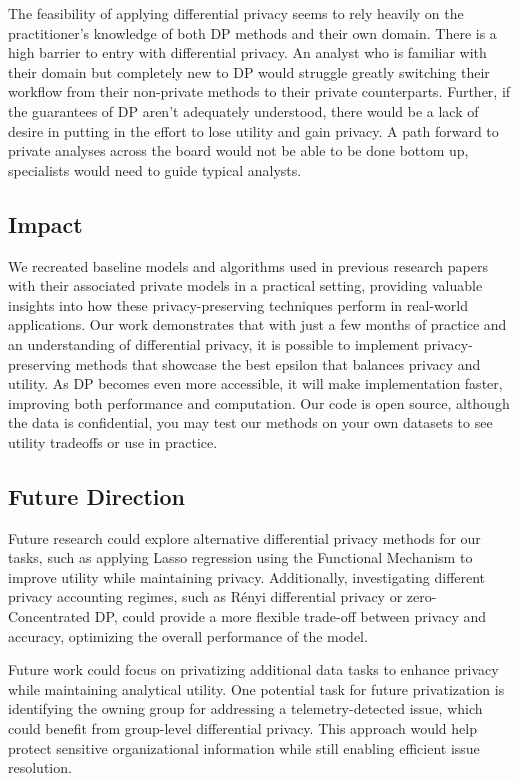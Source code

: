 \documentclass[12pt,letterpaper]{article}
\begin{document}
The feasibility of applying differential privacy seems to rely heavily on the practitioner's knowledge of both DP methods and their own domain. There is a high barrier to entry with differential privacy. An analyst who is familiar with their domain but completely new to DP would struggle greatly switching their workflow from their non-private methods to their private counterparts. Further, if the guarantees of DP aren't adequately understood, there would be a lack of desire in putting in the effort to lose utility and gain privacy. A path forward to private analyses across the board would not be able to be done bottom up, specialists would need to guide typical analysts.

\subsection{Impact}
We recreated baseline models and algorithms used in previous research papers with their associated private models in a practical setting, providing valuable insights into how these privacy-preserving techniques perform in real-world applications. Our work demonstrates that with just a few months of practice and an understanding of differential privacy, it is possible to implement privacy-preserving methods that showcase the best epsilon that balances privacy and utility. As DP becomes even more accessible, it will make implementation faster, improving both performance and computation. Our code is open source, although the data is confidential, you may test our methods on your own datasets to see utility tradeoffs or use in practice.

\subsection{Future Direction}
Future research could explore alternative differential privacy methods for our tasks, such as applying Lasso regression using the Functional Mechanism to improve utility while maintaining privacy. Additionally, investigating different privacy accounting regimes, such as Rényi differential privacy or zero-Concentrated DP, could provide a more flexible trade-off between privacy and accuracy, optimizing the overall performance of the model. 

Future work could focus on privatizing additional data tasks to enhance privacy while maintaining analytical utility. One potential task for future privatization is identifying the owning group for addressing a telemetry-detected issue, which could benefit from group-level differential privacy. This approach would help protect sensitive organizational information while still enabling efficient issue resolution. 
\end{document}
